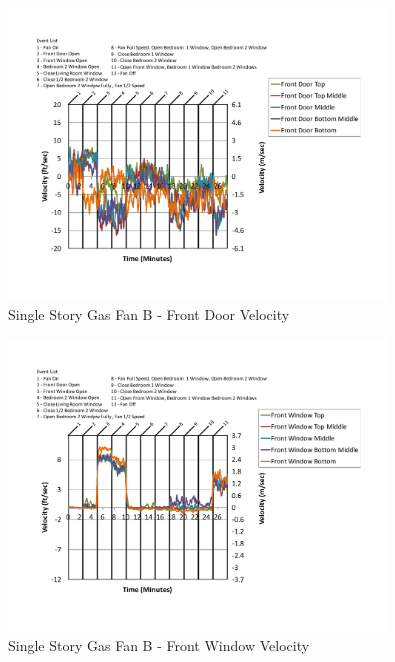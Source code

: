 \documentclass{article}
\begin{document}
\begin{appendices}
	\begin{figure}[H]
		\centering
		\includegraphics[height=3.05in,trim=0.67in 1.1in 0.67in 0.8in,clip=true]{0_Images/Results_Charts/ColdFlow/Single_Story/Gas/B/Front_Door_Velocity.pdf}
		\caption{Single Story Gas Fan B - Front Door Velocity}
	\end{figure}
 

	\begin{figure}[H]
		\centering
		\includegraphics[height=3.05in,trim=0.67in 1.1in 0.67in 0.8in,clip=true]{0_Images/Results_Charts/ColdFlow/Single_Story/Gas/B/Front_Window_Velocity.pdf}
		\caption{Single Story Gas Fan B - Front Window Velocity}
	\end{figure}
 
	\clearpage


\end{appendices}
\end{document}
